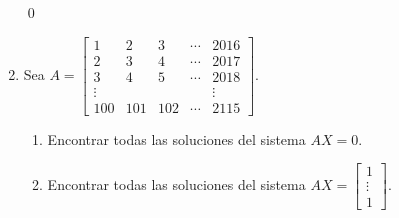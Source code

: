 \begin{enumerate}[topsep=6pt, itemsep=.4cm]
\qed

\item\label{matriz-2115} Sea $A=\begin{bmatrix}1 & 2 & 3 & \cdots & 2016 \\ 2 & 3 & 4 & \cdots & 2017 \\ 3&4&5& \cdots & 2018\\ \vdots & &&& \vdots \\ 100 & 101 & 102& \cdots& 2115\end{bmatrix}$.
\begin{enumerate}
   \item\label{matriz-2115-homo} Encontrar todas las soluciones del sistema $AX=0$.
   \item\label{matriz-2115-no-homo} Encontrar todas las soluciones del sistema $AX=\left[\begin{array}{c}
     1\\\vdots \\1 \end{array}\right]$.
\end{enumerate}

\rta


\end{enumerate}
